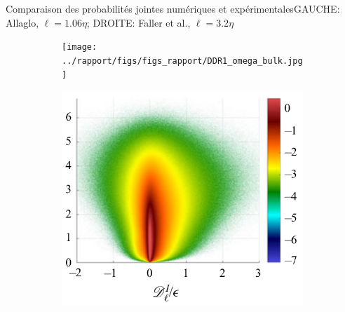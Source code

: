 \documentclass[aspectratio=169,usenames,dvipsnames]{beamer}
\begin{document}
\begin{frame}{Comparaison des probabilités jointes numériques et expérimentales}{GAUCHE: Allaglo, $\ell=1.06\eta$; 
    DROITE: Faller et al., $\ell=3.2\eta$}
    \begin{figure}[H]
        \centering
        \begin{subfigure}[b]{0.48\linewidth}
        \centering
        \texttt{[image: ../rapport/figs/figs\_rapport/DDR1\_omega\_bulk.jpg]}
        \end{subfigure}
        \begin{subfigure}[b]{0.4\linewidth}
          \centering
          \includegraphics[width=\textwidth]{figs/faller_l1_exp.png}
          \end{subfigure}
        \label{fig:DR_penal}
      \end{figure}
    \end{frame}
    
\end{document}
